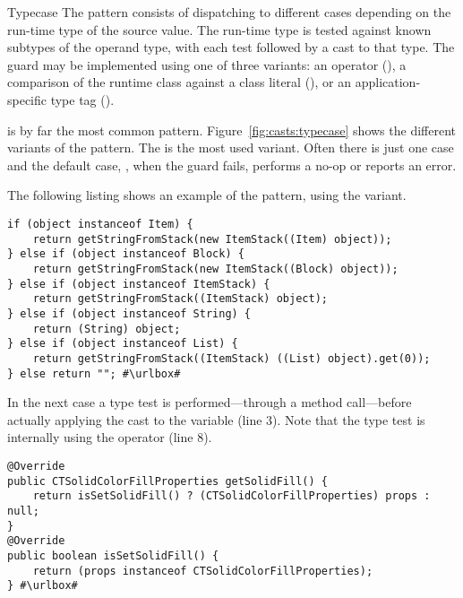 \begin{pattern}{Typecase}
The \thisp{} pattern consists of dispatching to different cases
depending on the run-time type of the source value.
The run-time type is tested against known subtypes of the operand type,
with each test followed by a cast to that type.
The guard may be implemented using one of three variants:
an  operator (),
a comparison of the runtime class against a class literal (),
or an application-specific type tag ().

\instances{}
\thisp{} is by far the most common pattern.
Figure~\ref{fig:casts:typecase} shows the different variants of the pattern.
The  is the most used variant.
Often there is just one case and the default case, \ie,
when the guard fails, performs a no-op or reports an error.


The following listing shows an example of the \thisp{} pattern,
using the  variant.

\def\urlvar{http://bit.ly/PenguinSquad_Enchiridion_2HnNwB7}
\begin{verbatim}
if (object instanceof Item) {
	return getStringFromStack(new ItemStack((Item) object));
} else if (object instanceof Block) {
	return getStringFromStack(new ItemStack((Block) object));
} else if (object instanceof ItemStack) {
	return getStringFromStack((ItemStack) object);
} else if (object instanceof String) {
	return (String) object;
} else if (object instanceof List) {
	return getStringFromStack((ItemStack) ((List) object).get(0));
} else return ""; #\urlbox#
\end{verbatim}

In the next case a type test is performed---through a method call---before actually applying the cast to the variable  (line 3).
Note that the type test is internally using the  operator (line 8).

\def\urlvar{http://bit.ly/apache_poi_2FW5SXU}
\begin{verbatim}
@Override
public CTSolidColorFillProperties getSolidFill() {
    return isSetSolidFill() ? (CTSolidColorFillProperties) props : null;
}
@Override
public boolean isSetSolidFill() {
    return (props instanceof CTSolidColorFillProperties);
} #\urlbox#
\end{verbatim}


\end{pattern}
